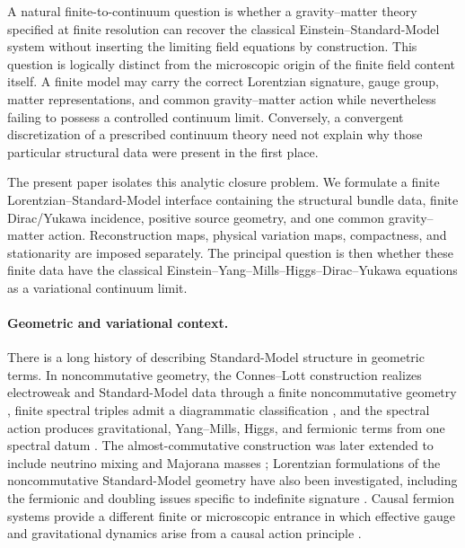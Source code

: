 \documentclass[11pt]{article}
\numberwithin{equation}{section}
\theoremstyle{definition}
\theoremstyle{remark}
\begin{document}
A natural finite-to-continuum question is whether a gravity--matter theory
specified at finite resolution can recover the classical
Einstein--Standard-Model system without inserting the limiting field equations
by construction.  This question is logically distinct from the microscopic
origin of the finite field content itself.  A finite model may carry the
correct Lorentzian signature, gauge group, matter representations, and common
gravity--matter action while nevertheless failing to possess a controlled
continuum limit.  Conversely, a convergent discretization of a prescribed
continuum theory need not explain why those particular structural data were
present in the first place.

The present paper isolates this analytic closure problem.  We formulate a
finite Lorentzian--Standard-Model interface containing the structural bundle
data, finite Dirac/Yukawa incidence, positive source geometry, and one common
gravity--matter action.  Reconstruction maps, physical variation maps,
compactness, and stationarity are imposed separately.  The principal question
is then whether these finite data have the classical
Einstein--Yang--Mills--Higgs--Dirac--Yukawa equations as a variational
continuum limit.

\paragraph{Geometric and variational context.}

There is a long history of describing Standard-Model structure in geometric
terms.  In noncommutative geometry, the Connes--Lott construction realizes
electroweak and Standard-Model data through a finite noncommutative geometry
\cite{ConnesLott1991}, finite spectral triples admit a diagrammatic
classification \cite{Krajewski1998}, and the spectral action produces
gravitational, Yang--Mills, Higgs, and fermionic terms from one spectral datum
\cite{ChamseddineConnes1997}.  The almost-commutative construction was later
extended to include neutrino mixing and Majorana masses
\cite{ChamseddineConnesMarcolli2007}; Lorentzian formulations of the
noncommutative Standard-Model geometry have also been investigated, including
the fermionic and doubling issues specific to indefinite signature
\cite{Barrett2007}.  Causal fermion systems provide a different finite or
microscopic entrance in which effective gauge and gravitational dynamics
arise from a causal action principle \cite{Finster2016}.
\end{document}
